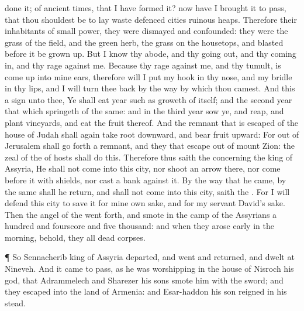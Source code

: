 {done it;
{} of
ancient
times, that I have
formed it? now have I
brought it to pass, that thou shouldest be to lay
waste
defenced
cities
{}
ruinous
heaps.
Therefore their
inhabitants
{} of
small
power, they were
dismayed and
confounded: they were
{} the
grass of the
field, and
{} the
green
herb,
{} the
grass on the
housetops, and
{}
blasted
before it be grown
up.
But I
know thy
abode, and thy going
out, and thy coming
in, and thy
rage against me.
Because thy
rage against me, and thy
tumult, is come
up into mine
ears, therefore will I
put my
hook in thy
nose, and my
bridle in thy
lips, and I will turn thee
back by the
way by which thou
camest.
And this
{} a
sign unto thee, Ye shall
eat
{}
year such as
groweth of itself; and the
second
year that which
springeth of the same: and in the
third
year
sow ye, and
reap, and
plant
vineyards, and
eat the
fruit thereof.
And the
remnant that is
escaped of the
house of
Judah shall
again take
root
downward, and
bear
fruit
upward:
For out of
Jerusalem shall go
forth a
remnant, and they that
escape out of
mount
Zion: the
zeal of the
{} of
hosts shall
do this.
Therefore thus
saith the
{} concerning the
king of
Assyria, He shall not
come into this
city, nor
shoot an
arrow there, nor come
before it with
shields, nor
cast a
bank against it.
By the
way that he
came, by the same shall he
return, and shall not
come into this
city,
saith the
{}.
For I will
defend this
city to
save it for mine own sake, and for my
servant
David’s sake.
Then the
angel of the
{} went
forth, and
smote in the
camp of the
Assyrians a
hundred and
fourscore and
five
thousand: and when they arose
early in the
morning, behold, they
{} all
dead
corpses.
\par }{\PP {}¶ So
Sennacherib
king of
Assyria
departed, and
went and
returned, and
dwelt at
Nineveh.
And it came to pass, as he was
worshipping in the
house of
Nisroch his
god, that
Adrammelech and
Sharezer his
sons
smote him with the
sword; and they
escaped into the
land of
Armenia: and
Esar-haddon his
son
reigned in his stead.

}

